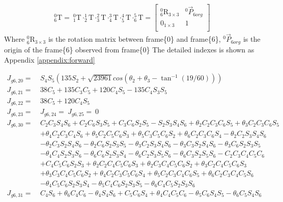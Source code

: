 \documentclass[12pt]{article}
\begin{document}
\begin{CJK}{UTF8}{bsmi}
\begin{equation*}
\begin{split}
^0_6\text{T} =
\ ^0_1\text{T} \cdot ^1_2\text{T} \cdot ^2_3\text{T} \cdot ^3_4\text{T} \cdot ^4_5\text{T} \cdot ^5_6\text{T} =
\begin{bmatrix}
^0_6\text{R}_{3\times 3} 	&^0\vec{P}_{6org}\\
0_{1\times 3}				&1\\
\end{bmatrix}
\end{split}
\end{equation*}
Where $^0_6\text{R}_{3\times 3}$ is the rotation matrix between frame\{0\} and frame\{6\}, $^0\vec{P}_{6org}$ is the origin of the frame\{6\} observed from frame\{0\}
The detailed indexes is shown as Appendix \ref{appendix:forward}



\begin{equation*}
\begin{split}
J_{g6,20} =\  &S_4S_5(135S_2 + \sqrt{23961}cos(\theta _2 + \theta _3 - \tan ^{-1}(19/60)))\\
J_{g6,21} =\  &38C_5 + 135C_3C_5 + 120C_4S_5 - 135C_4S_3S_5\\
J_{g6,22} =\  &38C_5 + 120C_4S_5\\
J_{g6,23} =\  &
J_{g6,24} =\  
J_{g6,25} =\  0\\
J_{g6,30} =\  &C_2C_3S_4S_6 + C_2C_6S_3S_5 + C_3C_6S_2S_5 - S_2S_3S_4S_6 + \theta _2C_2C_3C_6S_5 + \theta _3C_2C_3C_6S_5 \\
			  &+ \theta _4C_2C_3C_4S_6 + \theta _5C_2C_5C_6S_3 + \theta _5C_3C_5C_6S_2 + \theta _6C_2C_3C_6S_4 - \theta _2C_2S_3S_4S_6\\
			  & - \theta _2C_3S_2S_4S_6 - \theta _2C_6S_2S_3S_5 - \theta _3C_2S_3S_4S_6 - \theta _3C_3S_2S_4S_6 - \theta _3C_6S_2S_3S_5\\
			  & - \theta _4C_4S_2S_3S_6 - \theta _6C_6S_2S_3S_4 - \theta _6C_2S_3S_5S_6 - \theta _6C_3S_2S_5S_6 - C_2C_3C_4C_5C_6\\
			  & + C_4C_5C_6S_2S_3 + \theta _2C_2C_4C_5C_6S_3 + \theta _2C_3C_4C_5C_6S_2 + \theta _3C_2C_4C_5C_6S_3\\
			  & + \theta _3C_3C_4C_5C_6S_2 + \theta _4C_2C_3C_5C_6S_4 + \theta _5C_2C_3C_4C_6S_5 + \theta _6C_2C_3C_4C_5S_6\\
			  & - \theta _4C_5C_6S_2S_3S_4 - \theta _5C_4C_6S_2S_3S_5 - \theta _6C_4C_5S_2S_3S_6\\
J_{g6,31} =\  &C_4S_6 + \theta _6C_4C_6 - \theta _4S_4S_6 + C_5C_6S_4 + \theta _4C_4C_5C_6 - \theta _5C_6S_4S_5 - \theta _6C_5S_4S_6\\

\end{split}
\end{equation*}
\end{CJK}
\end{document}
